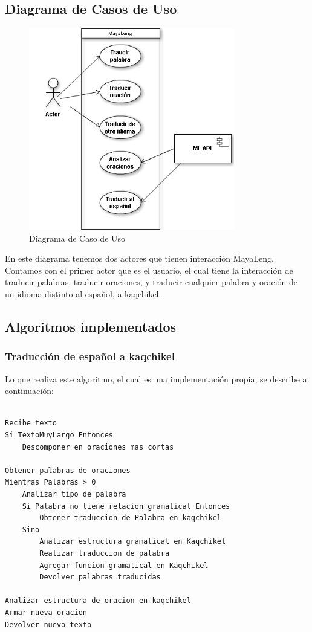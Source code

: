 \documentclass[a4paper,openright,11pt]{article}
\begin{document}
\subsection{Diagrama de Casos de Uso}
\begin{figure}[h]
	\centering
	\includegraphics[width=0.8\textwidth]{casouso}
	\caption{Diagrama de Caso de Uso}
	\label{fig:caso}
\end{figure}
En este diagrama tenemos dos actores que tienen interacción MayaLeng. Contamos con el primer actor que es el usuario, el cual tiene la interacción de traducir palabras, traducir oraciones, y traducir cualquier palabra y oración de un idioma distinto al español, a kaqchikel.
\newpage

\subsection{Algoritmos implementados}
\subsubsection{Traducción de español a kaqchikel}
Lo que realiza este algoritmo, el cual es una implementación propia, se describe a continuación:

\begin{lstlisting}

Recibe texto
Si TextoMuyLargo Entonces
	Descomponer en oraciones mas cortas
	
Obtener palabras de oraciones
Mientras Palabras > 0
	Analizar tipo de palabra
	Si Palabra no tiene relacion gramatical Entonces
		Obtener traduccion de Palabra en kaqchikel
	Sino
		Analizar estructura gramatical en Kaqchikel
		Realizar traduccion de palabra
		Agregar funcion gramatical en Kaqchikel
		Devolver palabras traducidas
	
Analizar estructura de oracion en kaqchikel
Armar nueva oracion
Devolver nuevo texto

\end{lstlisting}
\newpage
\end{document}
